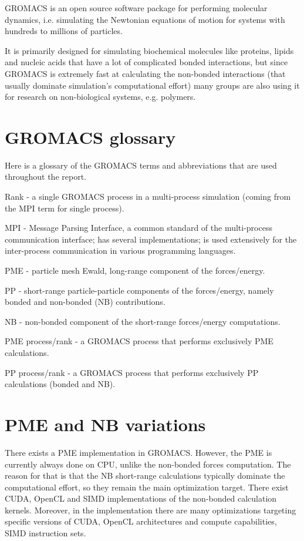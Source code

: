 \documentclass[12pt,a4paper]{report}
\begin{document}
GROMACS \cite{gromacshome} is an open source software package for performing molecular dynamics, i.e. simulating the Newtonian equations of motion for systems with hundreds to millions of particles. 

It is primarily designed for simulating biochemical molecules like proteins, lipids and nucleic acids that have a lot of complicated bonded interactions, but since GROMACS is extremely fast at calculating the non-bonded interactions (that usually dominate simulation's computational effort) many groups are also using it for research on non-biological systems, e.g. polymers.

\section{GROMACS glossary}
Here is a glossary of the GROMACS terms and abbreviations that are used throughout the report.

Rank - a single GROMACS process in a multi-process simulation (coming from the MPI term for single process).

MPI - Message Parsing Interface, a common standard of the multi-process communication interface; has several implementations; is used extensively for the inter-process communication in various programming languages.

PME - particle mesh Ewald, long-range component of the forces/energy.

PP - short-range particle-particle components of the forces/energy, namely bonded and non-bonded (NB) contributions.

NB - non-bonded component of the short-range forces/energy computations.

PME process/rank - a GROMACS process that performs exclusively PME calculations.

PP process/rank - a GROMACS process that performs exclusively PP calculations (bonded and NB).  

\section{PME and NB variations}

There exists a PME implementation in GROMACS. However, the PME is currently always done on CPU, unlike the non-bonded forces computation. The reason for that is that the NB short-range calculations typically dominate the computational effort, so they remain the main optimization target. There exist CUDA, OpenCL and SIMD implementations of the non-bonded calculation kernels. Moreover, in the implementation there are many optimizations targeting specific versions of CUDA, OpenCL architectures and compute capabilities, SIMD instruction sets. 
\end{document}
